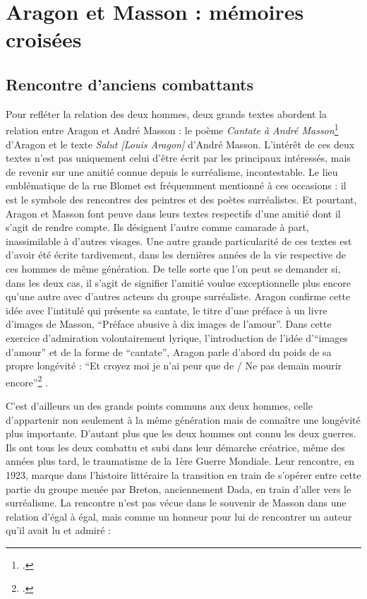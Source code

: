 \chapter{Aragon et Masson : mémoires croisées}
\section{Rencontre d'anciens combattants}
    Pour refléter la relation des deux hommes, deux grands textes abordent la relation entre Aragon et André Masson : le poème  \emph{Cantate à André Masson}\footcite[p681]{ecritssurla} d'Aragon et le texte \emph{Salut [Louis Aragon]} d'André Masson. L’intérêt de ces deux textes n’est pas uniquement celui d’être écrit par les principaux intéressés, mais de revenir sur une amitié connue depuis le surréalisme, incontestable. Le lieu emblématique de la rue Blomet est fréquemment mentionné à ces occasions : il est le symbole des rencontres des peintres et des poètes surréalistes. Et pourtant, Aragon et Masson font peuve dans leurs textes respectifs d'une amitié dont il s'agit de rendre compte. Ils désignent l'autre comme camarade à part, inassimilable à d’autres visages. Une autre grande particularité de ces textes est d’avoir été écrite tardivement, dans les dernières années de la vie respective de ces hommes de même génération. De telle sorte que l’on peut se demander si, dans les deux cas, il s’agit de signifier l'amitié voulue exceptionnelle plus encore qu'une autre avec d'autres acteurs du groupe surréaliste. Aragon confirme cette idée avec l'intitulé qui présente sa cantate, le titre d'une préface à un livre d’images de Masson, \enquote{Préface abusive à dix images de l’amour}. Dans cette exercice d'admiration volontairement lyrique, l'introduction de l’idée d’\enquote{images d’amour} et de la forme de \enquote{cantate}, Aragon parle d’abord du poids de sa propre longévité : \enquote{Et croyez moi je n’ai peur que de / Ne pas demain mourir encore}\footcite[p681]{ecritssurla} .

    C’est d’ailleurs un des grands points communs aux deux hommes, celle d’appartenir non seulement à la même génération mais de connaître une longévité plus importante. D’autant plus que les deux hommes ont connu les deux guerres. Ils ont tous les deux combattu et subi dans leur démarche créatrice, même des années plus tard, le traumatisme de la 1ère Guerre Mondiale. Leur rencontre, en 1923, marque dans l’histoire littéraire la transition en train de s’opérer entre cette partie du groupe menée par Breton, anciennement Dada, en train d’aller vers le surréalisme. La rencontre n’est pas vécue dans le souvenir de Masson dans une relation d’égal à égal, mais comme un honneur pour lui de rencontrer un auteur qu’il avait lu et admiré :

